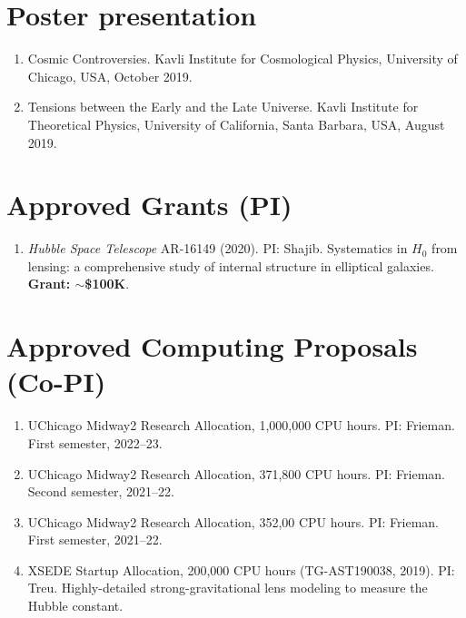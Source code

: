 \documentclass[margin, line]{res}
\begin{document}
\begin{resume}
\section{\sc Poster presentation}
\begin{enumerate}
	\item Cosmic Controversies. Kavli Institute for Cosmological Physics, University of Chicago, USA, October 2019.
	\item Tensions between the Early and the Late Universe. Kavli Institute for Theoretical Physics, University of California, Santa Barbara, USA, August 2019.
\end{enumerate}

\section{\sc Approved Grants (PI)}
\begin{enumerate}
	\item \textit{Hubble Space Telescope} AR-16149 (2020). PI: Shajib. Systematics in $H_0$ from lensing: a comprehensive study of internal structure in elliptical galaxies. \textbf{Grant: $\sim$\$100K}.
\end{enumerate}

\section{\sc Approved Computing Proposals (Co-PI)}
\begin{enumerate}
\item UChicago Midway2 Research Allocation, 1,000,000 CPU hours. PI: Frieman. First semester, 2022--23.
\item UChicago Midway2 Research Allocation, 371,800 CPU hours. PI: Frieman. Second semester, 2021--22.
\item UChicago Midway2 Research Allocation, 352,00 CPU hours. PI: Frieman. First semester, 2021--22.
\item XSEDE Startup Allocation, 200,000 CPU hours (TG-AST190038, 2019). PI: Treu. Highly-detailed strong-gravitational lens modeling to measure the Hubble constant.   
\end{enumerate}


\end{resume}
\end{document}
